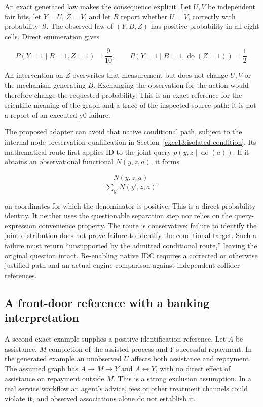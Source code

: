 An exact generated law makes the consequence explicit. Let \(U,V\) be
independent fair bits, let \(Y=U\), \(Z=V\), and let \(B\) report
whether \(U=V\), correctly with probability \(.9\). The observed law of
\((Y,B,Z)\) has positive probability in all eight cells. Direct
enumeration gives

\[
 P(Y=1\mid B=1,Z=1)=\frac9{10},
 \qquad
 P(Y=1\mid B=1,\operatorname{do}(Z=1))=\frac12.
\]

An intervention on \(Z\) overwrites that measurement but does not change
\(U,V\) or the mechanism generating \(B\). Exchanging the observation
for the action would therefore change the requested probability. This is
an exact reference for the scientific meaning of the graph and a trace
of the inspected source path; it is not a report of an executed y0
failure. \citep{exec13_y0_oracles}

The proposed adapter can avoid that native conditional path, subject to the internal node-preservation qualification in Section~\ref{exec13:isolated-condition}. Its mathematical route first applies ID to the joint query \(p(y,z\mid\operatorname{do}(a))\). If it
obtains an observational functional \(N(y,z,a)\), it forms

\[
 \frac{N(y,z,a)}{\sum_{y'}N(y',z,a)},
\]

on coordinates for which the denominator is positive. This is a direct
probability identity. It neither uses the questionable separation step
nor relies on the query-expression convenience property. The route is
conservative: failure to identify the joint distribution does not prove
failure to identify the conditional target. Such a failure must return
``unsupported by the admitted conditional route,'' leaving the original
question intact. Re-enabling native IDC requires a corrected or
otherwise justified path and an actual engine comparison against
independent collider references.

\hypertarget{a-front-door-reference-with-a-banking-interpretation}{%
\subsection{A front-door reference with a banking
interpretation}\label{a-front-door-reference-with-a-banking-interpretation}}

A second exact example supplies a positive identification reference. Let
\(A\) be assistance, \(M\) completion of the assisted process and \(Y\)
successful repayment. In the generated example an unobserved \(U\)
affects both assistance and repayment. The assumed graph has
\(A\to M\to Y\) and \(A\leftrightarrow Y\), with no direct effect of
assistance on repayment outside \(M\). This is a strong exclusion
assumption. In a real service workflow an agent's advice, fees or other
treatment channels could violate it, and observed associations alone do
not establish it.

